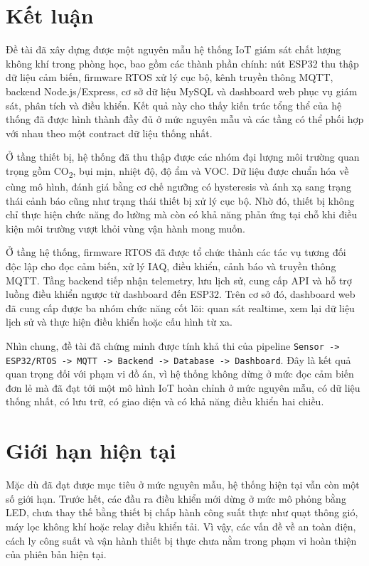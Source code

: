 \section{Kết luận}

Đề tài đã xây dựng được một nguyên mẫu hệ thống IoT giám sát chất lượng không khí trong
phòng học, bao gồm các thành phần chính: nút ESP32 thu thập dữ liệu cảm biến, firmware
RTOS xử lý cục bộ, kênh truyền thông MQTT, backend Node.js/Express, cơ sở dữ liệu MySQL
và dashboard web phục vụ giám sát, phân tích và điều khiển. Kết quả này cho thấy kiến
trúc tổng thể của hệ thống đã được hình thành đầy đủ ở mức nguyên mẫu và các tầng có thể
phối hợp với nhau theo một contract dữ liệu thống nhất.

Ở tầng thiết bị, hệ thống đã thu thập được các nhóm đại lượng môi trường quan trọng gồm
CO\textsubscript{2}, bụi mịn, nhiệt độ, độ ẩm và VOC. Dữ liệu được chuẩn hóa về cùng mô
hình, đánh giá bằng cơ chế ngưỡng có hysteresis và ánh xạ sang trạng thái cảnh báo cũng
như trạng thái thiết bị xử lý cục bộ. Nhờ đó, thiết bị không chỉ thực hiện chức năng đo
lường mà còn có khả năng phản ứng tại chỗ khi điều kiện môi trường vượt khỏi vùng vận
hành mong muốn.

Ở tầng hệ thống, firmware RTOS đã được tổ chức thành các tác vụ tương đối độc lập cho
đọc cảm biến, xử lý IAQ, điều khiển, cảnh báo và truyền thông MQTT. Tầng backend tiếp
nhận telemetry, lưu lịch sử, cung cấp API và hỗ trợ luồng điều khiển ngược từ dashboard
đến ESP32. Trên cơ sở đó, dashboard web đã cung cấp được ba nhóm chức năng cốt lõi:
quan sát realtime, xem lại dữ liệu lịch sử và thực hiện điều khiển hoặc cấu hình từ xa.

Nhìn chung, đề tài đã chứng minh được tính khả thi của pipeline
\texttt{Sensor -> ESP32/RTOS -> MQTT -> Backend -> Database -> Dashboard}. Đây là kết quả
quan trọng đối với phạm vi đồ án, vì hệ thống không dừng ở mức đọc cảm biến đơn lẻ mà đã
đạt tới một mô hình IoT hoàn chỉnh ở mức nguyên mẫu, có dữ liệu thống nhất, có lưu trữ,
có giao diện và có khả năng điều khiển hai chiều.

\section{Giới hạn hiện tại}

Mặc dù đã đạt được mục tiêu ở mức nguyên mẫu, hệ thống hiện tại vẫn còn một số giới hạn.
Trước hết, các đầu ra điều khiển mới dừng ở mức mô phỏng bằng LED, chưa thay thế bằng
thiết bị chấp hành công suất thực như quạt thông gió, máy lọc không khí hoặc relay điều
khiển tải. Vì vậy, các vấn đề về an toàn điện, cách ly công suất và vận hành thiết bị
thực chưa nằm trong phạm vi hoàn thiện của phiên bản hiện tại.

